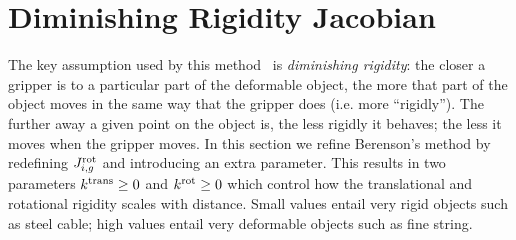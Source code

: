 
\section{Diminishing Rigidity Jacobian}
\label{sec:diminishing_rigidity}

The key assumption used by this method~\cite{Berenson2013} is \textit{diminishing rigidity}: the closer a gripper is to a particular part of the deformable object, the more that part of the object moves in the same way that the gripper does (i.e. more ``rigidly''). The further away a given point on the object is, the less rigidly it behaves; the less it moves when the gripper moves. In this section we refine Berenson's method by redefining $J^{\textrm{rot}}_{i, g}$ and introducing an extra parameter. This results in two parameters $k^{\textrm{trans}} \geq 0$ and $k^{\textrm{rot}} \geq 0$ which control how the translational and rotational rigidity scales with distance. Small values entail very rigid objects such as steel cable; high values entail very deformable objects such as fine string.

